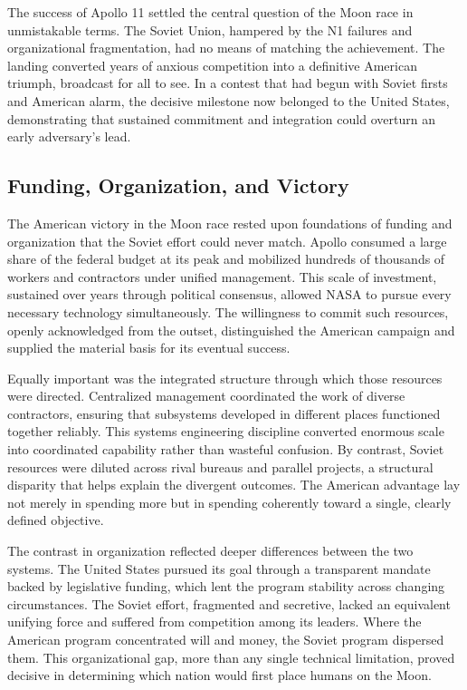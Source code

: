 The success of Apollo 11 settled the central question of the Moon race in unmistakable terms. The Soviet Union, hampered by the N1 failures and organizational fragmentation, had no means of matching the achievement. The landing converted years of anxious competition into a definitive American triumph, broadcast for all to see. In a contest that had begun with Soviet firsts and American alarm, the decisive milestone now belonged to the United States, demonstrating that sustained commitment and integration could overturn an early adversary's lead. \cite{chaikin1994} \cite{nasa2019}

\subsection{Funding, Organization, and Victory}
The American victory in the Moon race rested upon foundations of funding and organization that the Soviet effort could never match. Apollo consumed a large share of the federal budget at its peak and mobilized hundreds of thousands of workers and contractors under unified management. This scale of investment, sustained over years through political consensus, allowed NASA to pursue every necessary technology simultaneously. The willingness to commit such resources, openly acknowledged from the outset, distinguished the American campaign and supplied the material basis for its eventual success.

Equally important was the integrated structure through which those resources were directed. Centralized management coordinated the work of diverse contractors, ensuring that subsystems developed in different places functioned together reliably. This systems engineering discipline converted enormous scale into coordinated capability rather than wasteful confusion. By contrast, Soviet resources were diluted across rival bureaus and parallel projects, a structural disparity that helps explain the divergent outcomes. The American advantage lay not merely in spending more but in spending coherently toward a single, clearly defined objective.

The contrast in organization reflected deeper differences between the two systems. The United States pursued its goal through a transparent mandate backed by legislative funding, which lent the program stability across changing circumstances. The Soviet effort, fragmented and secretive, lacked an equivalent unifying force and suffered from competition among its leaders. Where the American program concentrated will and money, the Soviet program dispersed them. This organizational gap, more than any single technical limitation, proved decisive in determining which nation would first place humans on the Moon.

